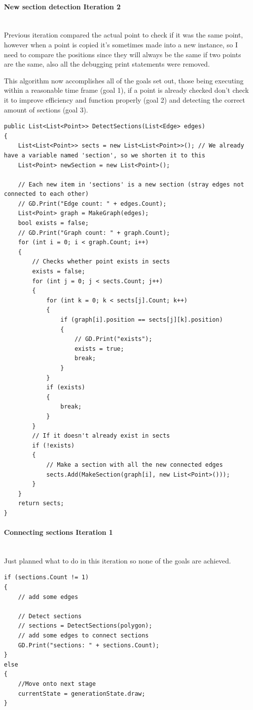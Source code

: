 \documentclass{article}
\newcommand{\parBr}{\vspace{5mm}}%
\newcommand{\myparagraph}[1]{\paragraph{#1}\mbox{}\\} %
\begin{document}
\myparagraph{New section detection Iteration 2}
Previous iteration compared the actual point to check if it was the same point, however when a point is copied it's sometimes made into a new instance, so I need to compare the positions since they will always be the same if two points are the same, also all the debugging print statements were removed.

\parBr

This algorithm now accomplishes all of the goals set out, those being executing within a reasonable time frame (goal 1), if a point is already checked don't check it to improve efficiency and function properly (goal 2) and detecting the correct amount of sections (goal 3).
\begin{lstlisting}
public List<List<Point>> DetectSections(List<Edge> edges)
{
    List<List<Point>> sects = new List<List<Point>>(); // We already have a variable named 'section', so we shorten it to this
    List<Point> newSection = new List<Point>();

    // Each new item in 'sections' is a new section (stray edges not connected to each other)
    // GD.Print("Edge count: " + edges.Count);
    List<Point> graph = MakeGraph(edges);
    bool exists = false;
    // GD.Print("Graph count: " + graph.Count);
    for (int i = 0; i < graph.Count; i++)
    {
        // Checks whether point exists in sects
        exists = false;
        for (int j = 0; j < sects.Count; j++)
        {
            for (int k = 0; k < sects[j].Count; k++)
            {
                if (graph[i].position == sects[j][k].position)
                {
                    // GD.Print("exists");
                    exists = true;
                    break;
                }
            }
            if (exists)
            {
                break;
            }
        }
        // If it doesn't already exist in sects
        if (!exists)
        {
            // Make a section with all the new connected edges
            sects.Add(MakeSection(graph[i], new List<Point>()));
        }
    }
    return sects;
}
\end{lstlisting}

\myparagraph{Connecting sections Iteration 1}
Just planned what to do in this iteration so none of the goals are achieved.
\begin{lstlisting}
if (sections.Count != 1)
{
    // add some edges
                
    // Detect sections
    // sections = DetectSections(polygon);
    // add some edges to connect sections
    GD.Print("sections: " + sections.Count);
}
else
{
	//Move onto next stage
    currentState = generationState.draw;
}

\end{lstlisting}
\end{document}
